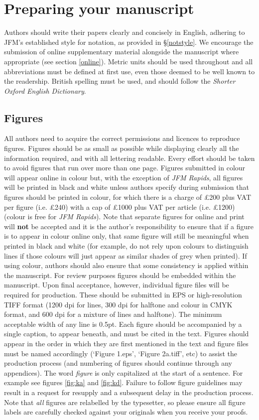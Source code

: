 \documentclass{jfm}
\begin{document}
\section{Preparing your manuscript}
Authors should write their papers clearly and concisely in English, adhering to JFM's established style for notation, as provided in \S\ref{notstyle}. We encourage the submission of online supplementary material alongside the manuscript where appropriate (see section \ref{online}). Metric units should be used throughout and all abbreviations must be defined at first use, even those deemed to be well known to the readership. British spelling must be used, and should follow the \textit{Shorter Oxford English Dictionary}.

\subsection{Figures}
All authors need to acquire the correct permissions and licences to reproduce figures. Figures should be as small as possible while displaying clearly all the information required, and with all lettering readable. Every effort should be taken to avoid figures that run over more than one page. Figures submitted in colour will appear online in colour but, with the exception of {\it JFM Rapids}, all figures will be printed in black and white unless authors specify during submission that figures should be printed in colour, for which there is a charge of \pounds200 plus VAT per figure (i.e. \pounds240) with a cap of \pounds1000 plus VAT per article (i.e. \pounds1200) (colour is free for {\it JFM Rapids}).  Note that separate figures for online and print will {\bf not} be accepted and it is the author's responsibility to ensure that if a figure is to appear in colour online only, that same figure will still be meaningful when printed in black and white (for example, do not rely upon colours to distinguish lines if those colours will just appear as similar shades of grey when printed). If using colour, authors should also ensure that some consistency is applied within the manuscript. For review purposes figures should be embedded within the manuscript. Upon final acceptance, however, individual figure files will be required for production. These should be submitted in EPS or high-resolution TIFF format (1200 dpi for lines, 300 dpi for halftone and colour in CMYK format, and 600 dpi for a mixture of lines and halftone). The minimum acceptable width of any line is 0.5pt. Each figure should be accompanied by a single caption, to appear beneath, and must be cited in the text. Figures should appear in the order in which they are first mentioned in the text and figure files must be named accordingly (`Figure 1.eps', `Figure 2a.tiff', etc) to assist the production process (and numbering of figures should continue through any appendices). The word \textit {figure} is only capitalized at the start of a sentence. For example see figures \ref{fig:ka} and \ref{fig:kd}. Failure to follow figure guidelines may result in a request for resupply and a subsequent delay in the production process. Note that {\em all} figures are relabelled by the typesetter, so please ensure all figure labels are carefully checked against your originals when you receive your proofs. 
\end{document}
